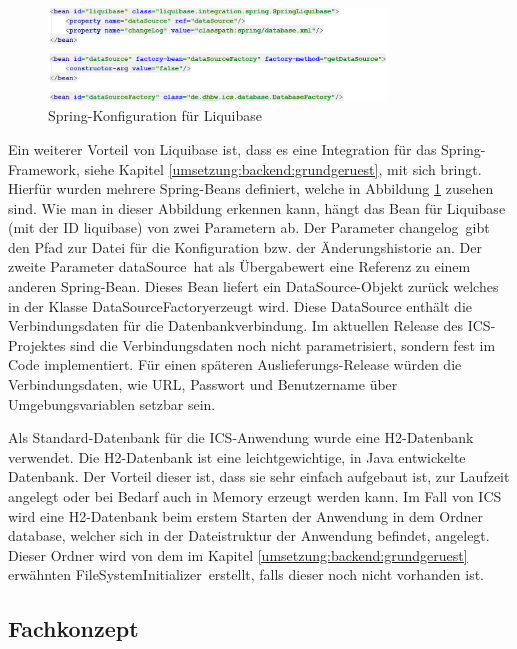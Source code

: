 	\begin{figure}[H]
		\centering 
		\includegraphics[width=0.8\textwidth]{img/liquibase_beans}
		\captionsetup{format=hang}
		\caption[Spring-Konfiguration für Liquibase]{\label{fig:liquibase_spring}Spring-Konfiguration für Liquibase}
	\end{figure}
	
	Ein weiterer Vorteil von Liquibase ist, dass es eine Integration für das Spring-Framework, siehe Kapitel \ref{umsetzung:backend:grundgeruest}, mit sich bringt. Hierfür wurden mehrere Spring-Beans definiert, welche in Abbildung \ref{fig:liquibase_spring} zusehen sind. Wie man in dieser Abbildung erkennen kann, hängt das Bean für Liquibase (mit der \ac{ID} \glqq liquibase\grqq) von zwei Parametern ab. Der Parameter \glqq changelog\grqq \, gibt den Pfad zur Datei für die Konfiguration bzw. der Änderungshistorie an. Der zweite Parameter \glqq dataSource\grqq \, hat als Übergabewert eine Referenz zu einem anderen Spring-Bean. Dieses Bean liefert ein \glqq DataSource\grqq-Objekt zurück welches in der Klasse \glqq DataSourceFactory\grqq erzeugt wird. Diese DataSource enthält die Verbindungsdaten für die Datenbankverbindung. Im aktuellen Release des \ac{ICS}-Projektes sind die Verbindungsdaten noch nicht parametrisiert, sondern fest im Code implementiert. Für einen späteren Auslieferungs-Release würden die Verbindungsdaten, wie URL, Passwort und Benutzername über Umgebungsvariablen setzbar sein.
	
	Als Standard-Datenbank für die \ac{ICS}-Anwendung wurde eine H2-Datenbank verwendet. Die H2-Datenbank ist eine leichtgewichtige, in Java entwickelte Datenbank.\autocite{H2} Der Vorteil dieser ist, dass sie sehr einfach aufgebaut ist, zur Laufzeit angelegt oder bei Bedarf auch in Memory erzeugt werden kann. Im Fall von \ac{ICS} wird eine H2-Datenbank beim erstem Starten der Anwendung in dem Ordner \glqq database\grqq, welcher sich in der Dateistruktur der Anwendung befindet, angelegt. Dieser Ordner wird von dem im Kapitel \ref{umsetzung:backend:grundgeruest} erwähnten \glqq FileSystemInitializer\grqq \, erstellt, falls dieser noch nicht vorhanden ist.

	\subsection{Fachkonzept}
	
